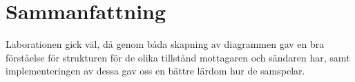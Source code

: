 \section{Sammanfattning}

Laborationen gick väl, då genom båda skapning av diagrammen gav en bra förståelse för strukturen för
de olika tillstånd mottagaren och sändaren har, samt implementeringen av dessa gav oss en bättre
lärdom hur de samspelar.
